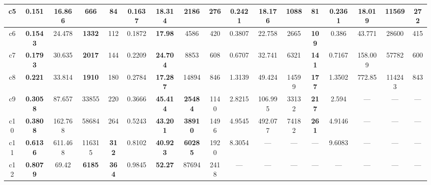 \begin{tabular}{||c||c|c|c|c||c|c|c|c||c|c|c|c||c|c|c|c||}
\hline%
c5&\small{\textbf{0.151}}&\small{\textbf{16.866}}&\small{\textbf{666}}&\small{84}&\small{0.1637}&\small{18.314}&\small{2186}&\small{276}&\small{0.2421}&\small{18.176}&\small{1088}&\small{\textbf{81}}&\small{0.2361}&\small{18.019}&\small{11569}&\small{272}\\%
\hline%
c6&\small{\textbf{0.1543}}&\small{24.478}&\small{\textbf{1332}}&\small{112}&\small{0.1872}&\small{\textbf{17.98}}&\small{4586}&\small{420}&\small{0.3807}&\small{22.758}&\small{2665}&\small{\textbf{109}}&\small{0.386}&\small{43.771}&\small{28600}&\small{415}\\%
\hline%
c7&\small{\textbf{0.1793}}&\small{30.635}&\small{\textbf{2017}}&\small{144}&\small{0.2209}&\small{\textbf{24.704}}&\small{8853}&\small{608}&\small{0.6707}&\small{32.741}&\small{6321}&\small{\textbf{141}}&\small{0.7167}&\small{158.009}&\small{57782}&\small{600}\\%
\hline%
c8&\small{\textbf{0.221}}&\small{33.814}&\small{\textbf{1910}}&\small{180}&\small{0.2784}&\small{\textbf{17.287}}&\small{14894}&\small{846}&\small{1.3139}&\small{49.424}&\small{14599}&\small{\textbf{177}}&\small{1.3502}&\small{772.85}&\small{114243}&\small{843}\\%
\hline%
c9&\small{\textbf{0.3058}}&\small{87.657}&\small{33855}&\small{220}&\small{0.3666}&\small{\textbf{45.414}}&\small{\textbf{25484}}&\small{1140}&\small{2.8215}&\small{106.995}&\small{33132}&\small{\textbf{217}}&\small{2.594}&\small{---}&\small{---}&\small{---}\\%
\hline%
c10&\small{\textbf{0.3808}}&\small{162.768}&\small{58684}&\small{264}&\small{0.5243}&\small{\textbf{43.201}}&\small{\textbf{38910}}&\small{1496}&\small{4.9545}&\small{492.077}&\small{74182}&\small{\textbf{261}}&\small{4.9146}&\small{---}&\small{---}&\small{---}\\%
\hline%
c11&\small{\textbf{0.6136}}&\small{611.468}&\small{116315}&\small{\textbf{312}}&\small{0.8102}&\small{\textbf{40.923}}&\small{\textbf{60285}}&\small{1920}&\small{8.3054}&\small{---}&\small{---}&\small{---}&\small{9.6083}&\small{---}&\small{---}&\small{---}\\%
\hline%
c12&\small{\textbf{0.8079}}&\small{69.42}&\small{\textbf{6185}}&\small{\textbf{364}}&\small{0.9845}&\small{\textbf{52.27}}&\small{87694}&\small{2418}&\small{---}&\small{---}&\small{---}&\small{---}&\small{---}&\small{---}&\small{---}&\small{---}\\%
\hline%
\end{tabular}
